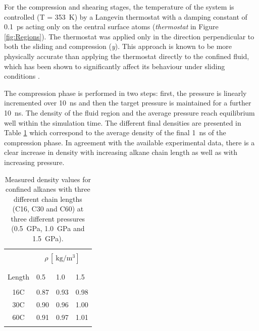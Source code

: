 \documentclass[aps,prb,reprint,superscriptaddress, a4paper]{revtex4-1}
\begin{document}
For the compression and shearing stages, the temperature of the system is controlled (T = \SI{353}{\kelvin}) by a Langevin thermostat \cite{Schneider1978} with a damping constant of \SI{0.1}{\pico\second} acting only on the central surface atoms (\textit{thermostat} in Figure \ref{fig:Regions}). The thermostat was applied only in the direction perpendicular to both the sliding and compression (\emph{y}). This approach is known to be more physically accurate than applying the thermostat directly to the confined fluid, which has been shown to significantly affect its behaviour under sliding conditions \cite{Liem1992,Bernardi2010,Yong2013}.

The compression phase is performed in two steps: first, the pressure is linearly incremented over \SI{10}{\nano\second} and then the target pressure is maintained for a further \SI{10}{\nano\second}. The density of the fluid region and the average pressure reach equilibrium well within the simulation time. The different final densities are presented in Table \ref{tab:rho} which correspond to the average density of the final \SI{1}{\nano\second} of the compression phase. In agreement with the available experimental data\cite{Griesbaum2000}, there is a clear increase in density with increasing alkane chain length as well as with increasing pressure.

\begin{table}
	\caption{Measured density values for confined alkanes  with three different chain lengths (C16, C30 and C60) at three different pressures (\SI{0.5}{\giga\pascal}, \SI{1.0}{\giga\pascal} and \SI{1.5}{\giga\pascal}).}   
	\centering     
	\begin{tabular}{c | l l  l}
		\hline\hline\\ [-2ex]

		
										&	\multicolumn{3}{c}{ $\rho \, [\SI{}{\kilogram\per\cubic\meter}]$} \\

		\hline\\ [-2ex]
		\backslashbox{Chain \\ Length}{P $[\SI{}{\giga\pascal}]$}	&	0.5		&	1.0		&	1.5	\\

		\hline\\ [-2ex]
		16C								&	0.87	&	0.93	&	0.98	\\
		30C								&	0.90	&	0.96	&	1.00	\\	
		60C								&	0.91	&	0.97	&	1.01	\\	

		\hline\hline    \\[-2ex]
	\end{tabular}
	\label{tab:rho}  
\end{table}
\end{document}
